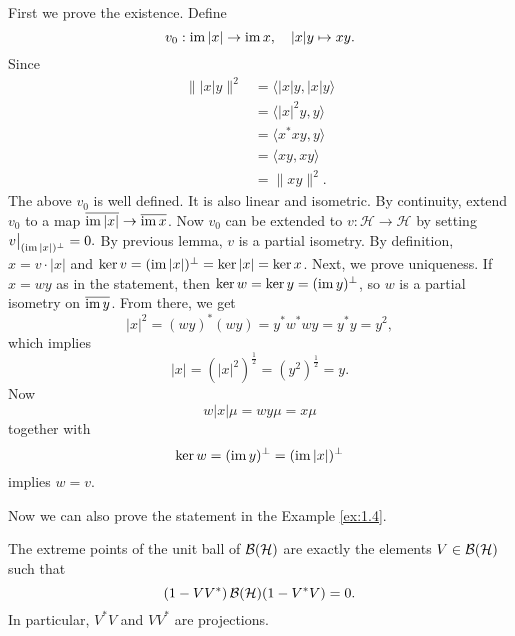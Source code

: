 \begin{myproof}
  First we prove the existence. Define $$v_0 : \operatorname{im} |x| \to \operatorname{im} x,\quad |x|y \mapsto xy.$$
  Since \begin{align*}
    \| |x| y\|^2 &= \langle |x|y, |x|y \rangle \\
    &= \langle |x|^2 y, y\rangle\\
    &= \langle x^* x y, y\rangle\\
    &= \langle xy, xy\rangle\\
    &= \| xy\|^2.
  \end{align*}
  The above $v_0$ is well defined. It is also linear and isometric.
  By continuity, extend $v_0$ to a map $\overline{\operatorname{im} |x|} \to \overline{\operatorname{im} x}$.
  Now $v_0$ can be extended to $v: \mathcal{H} \to \mathcal{H}$ by setting 
  $v\big|_{(\operatorname{im} |x|)^\perp} = 0.$ By previous lemma, $v$ is a partial isometry.
  By definition, $x = v \cdot |x|$ and $\ker v = (\operatorname{im} |x|)^\perp = \ker |x| = \ker x$.
  Next, we prove uniqueness. If $x = wy$ as in the statement, then $\ker w = \ker y = (\operatorname{im} y)^\perp$,
  so $w$ is a partial isometry on $\overline{\operatorname{im} y}$. From there, we get 
  $$|x|^2 = (wy)^* (wy) = y^* w^* w y = y^* y = y^2,$$
  which implies 
  $$|x| = (|x|^2)^{\frac{1}{2}} = (y^2)^{\frac{1}{2}} = y.$$
  Now $$w|x| \mu = wy \mu = x\mu$$
  together with 
  $$\ker w = (\operatorname{im} y)^\perp = (\operatorname{im} |x|)^\perp$$ implies $w = v$.
\end{myproof}

Now we can also prove the statement in the Example \ref{ex:1.4}.

\begin{proposition}
  The extreme points of the unit ball of $\operatorname{\mathcal{B} (\mathcal{H})}$ are exactly the elements $V \in \operatorname{\mathcal{B} (\mathcal{H})}$ such that 
  $$(1 - V V^*) \operatorname{\mathcal{B} (\mathcal{H})} (1 - V^* V) = 0.$$ In particular, $V^* V$ and $V V^*$ are projections.
\end{proposition}

